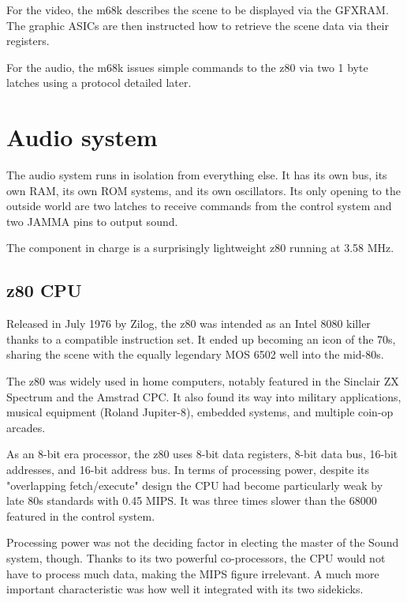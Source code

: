 For the video, the m68k describes the scene to be displayed via the GFXRAM. The graphic ASICs are then instructed how to retrieve the scene data via their registers. 

For the audio, the m68k issues simple commands to the z80 via two 1 byte latches using a protocol detailed later.
  











\pagebreak
\section{Audio system}
The audio system runs in isolation from everything else. It has its own bus, its own RAM, its own ROM systems, and its own oscillators. Its only opening to the outside world are two latches to receive commands from the control system and two JAMMA pins to output sound.

The component in charge is a surprisingly lightweight z80 running at 3.58 MHz.

\subsection{z80 CPU}
Released in July 1976 by Zilog, the z80 was intended as an Intel 8080 killer thanks to a compatible instruction set. It ended up becoming an icon of the 70s, sharing the scene with the equally legendary MOS 6502 well into the mid-80s. 

The z80 was widely used in home computers, notably featured in the Sinclair ZX Spectrum and the Amstrad CPC. It also found its way into military applications, musical equipment (Roland Jupiter-8), embedded systems, and multiple coin-op arcades. 

As an 8-bit era processor, the z80 uses 8-bit data registers, 8-bit data bus, 16-bit addresses, and 16-bit address bus. In terms of processing power, despite its "overlapping fetch/execute" design the CPU had become particularly weak by late 80s standards with 0.45 MIPS. It was three times slower than the 68000 featured in the control system\cite{mips}. 


Processing power was not the deciding factor in electing the master of the Sound system, though. Thanks to its two powerful co-processors, the CPU would not have to process much data, making the MIPS figure irrelevant. A much more important characteristic was how well it integrated with its two sidekicks.

